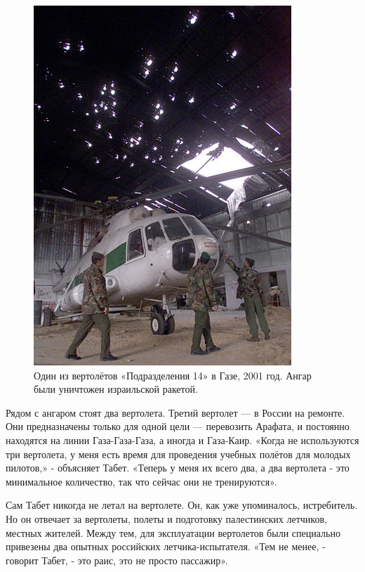 \begin{figure}[h!tb] 
	\centering\includegraphics[scale=0.8]{History_Tabett/ryAlPiWH3Xc.jpg}
	\caption{Один из вертолётов «Подразделения 14» в Газе, 2001 год. Ангар были уничтожен израильской ракетой.}%
\end{figure}

Рядом с ангаром стоят два вертолета. Третий вертолет — в России на ремонте. Они предназначены только для одной цели — перевозить Арафата, и постоянно находятся на линии Газа-Газа-Газа, а иногда и Газа-Каир. «Когда не используются три вертолета, у меня есть время для проведения учебных полётов для молодых пилотов,» - объясняет Табет. «Теперь у меня их всего два, а два вертолета - это минимальное количество, так что сейчас они не тренируются».

Сам Табет никогда не летал на вертолете. Он, как уже упоминалось, истребитель. Но он отвечает за вертолеты, полеты и подготовку палестинских летчиков, местных жителей. Между тем, для эксплуатации вертолетов были специально привезены два опытных российских летчика-испытателя. «Тем не менее, - говорит Табет, - это раис, это не просто пассажир».

